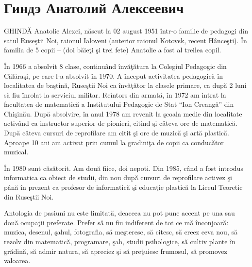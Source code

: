 \section{Гиндэ Анатолий Алексеевич}

GHIND\u{A}  Anatolie Alexei, n\u{a}scut la 02 august 1951 \^{i}ntr-o familie de pedagogi din satul Ruse\c{s}tii Noi, raionul Ialoveni (anterior raionul Kotovsk, recent H\^{a}nce\c{s}ti). \^{I}n familia de 5 copii – (doi b\u{a}ie\c{t}i \c{s}i trei fete) Anatolie a fost al treilea copil.

\^{I}n 1966 a absolvit 8 clase, continu\^{a}nd \^{i}nv\u{a}\c{t}\u{a}tura la Colegiul Pedagogic din C\u{a}l\u{a}ra\c{s}i, pe care l-a absolvit \^{i}n 1970.  A \^{i}nceput activitatea pedagogic\u{a} \^{i}n localitatea de ba\c{s}tin\u{a}, Ruse\c{s}tii Noi ca \^{i}nv\u{a}\c{t}\u{a}tor la clasele primare, ca dup\u{a} 2 luni s\u{a} fiu \^{i}nrolat la serviciul militar. Re\^{i}ntors din armat\u{a}, \^{i}n 1972 am intrat la facultatea de matematic\u{a} a Institutului Pedagogic de Stat ``Ion Creang\u{a}'' din Chi\c{s}in\u{a}u. Dup\u{a} absolvire, \^{i}n anul 1978 am revenit la \c{s}coala medie din localitate activ\^{a}nd ca instructor superior de pionieri, citind \c{s}i c\^{a}teva ore de matematic\u{a}. Dup\u{a} c\^{a}teva cursuri de reprofilare am citit \c{s}i ore de muzic\u{a} \c{s}i art\u{a} plastic\u{a}. Aproape 10 ani am activat prin cumul la gradini\c{t}a de copii ca conduc\u{a}tor muzical. 
	
\^{I}n 1980 sunt c\u{a}s\u{a}torit. Am dou\u{a} fiice, doi nepoti. Din 1985, c\^{a}nd a fost introdus informatica ca obiect de studii, din nou dup\u{a} cursuri de reprofilare activez \c{s}i p\^{a}n\u{a} \^{i}n prezent ca profesor de informatic\u{a} \c{s}i educa\c{t}ie plastic\u{a} la Liceul Teoretic din Ruse\c{s}tii Noi.
	
Antologia de pasiuni nu este limitat\u{a}, deaceea nu pot pune accent pe una sau dou\u{a} ocupa\c{t}ii preferate. Prefer s\u{a} nu fiu indiferent de tot ce m\u{a} \^{i}nconjoar\u{a}: muzica, desenul, \c{s}ahul, fotografia, s\u{a} me\c{s}teresc, s\u{a} citesc, s\u{a} creez ceva nou, s\u{a} rezolv din matematic\u{a}, programare, \c{s}ah, studii psihologice, s\u{a} cultiv plante \^{i}n gr\u{a}din\u{a}, s\u{a} admir natura, s\u{a} apreciez \c{s}i s\u{a} pre\c{t}uiesc frumosul, s\u{a} promovez valoarea.
	
